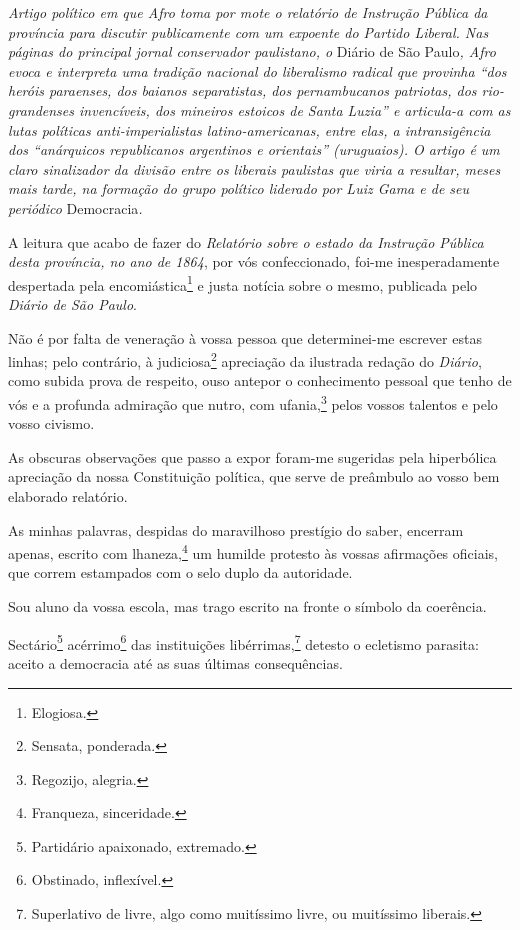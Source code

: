 \begin{didascalia}
\emph{Artigo político em que Afro toma por mote o relatório de
Instrução Pública da província para discutir publicamente com um
expoente do Partido Liberal. Nas páginas do principal jornal conservador
paulistano, o} Diário de São Paulo\emph{, Afro evoca e interpreta
uma tradição nacional do liberalismo radical que provinha ``dos heróis
paraenses, dos baianos separatistas, dos pernambucanos patriotas, dos
rio-grandenses invencíveis, dos mineiros estoicos de Santa Luzia'' e
articula-a com as lutas políticas anti-imperialistas latino-americanas,
entre elas, a intransigência dos ``anárquicos republicanos argentinos e
orientais'' (uruguaios). O artigo é um claro sinalizador da divisão entre
os liberais paulistas que viria a resultar, meses mais tarde, na
formação do grupo político liderado por Luiz Gama e de seu periódico}
Democracia\emph{.}
\end{didascalia}



A leitura que acabo de fazer do \emph{Relatório sobre o estado da
Instrução Pública desta província, no ano de 1864}, por vós
confeccionado, foi-me inesperadamente despertada pela
encomiástica\footnote{Elogiosa.} e justa notícia sobre o mesmo,
publicada pelo \emph{Diário de São Paulo}.

Não é por falta de veneração à vossa pessoa que determinei-me escrever
estas linhas; pelo contrário, à judiciosa\footnote{Sensata, ponderada.}
apreciação da ilustrada redação do \emph{Diário}, como subida prova de %
respeito, ouso antepor o conhecimento pessoal que tenho de vós e a
profunda admiração que nutro, com ufania,\footnote{Regozijo, alegria.}
pelos vossos talentos e pelo vosso civismo.

As obscuras observações que passo a expor foram-me sugeridas pela
hiperbólica apreciação da nossa Constituição política, que serve de
preâmbulo ao vosso bem elaborado relatório.

As minhas palavras, despidas do maravilhoso prestígio do saber, encerram
apenas, escrito com lhaneza,\footnote{Franqueza, sinceridade.} um
humilde protesto às vossas afirmações oficiais, que correm estampados
com o selo duplo da autoridade.

Sou aluno da vossa escola, mas trago escrito na fronte o símbolo da
coerência.

Sectário\footnote{Partidário apaixonado, extremado.}
acérrimo\footnote{Obstinado, inflexível.} das instituições
libérrimas,\footnote{Superlativo de livre, algo como muitíssimo livre,
  ou muitíssimo liberais.} detesto o ecletismo parasita: aceito a
democracia até as suas últimas consequências.

